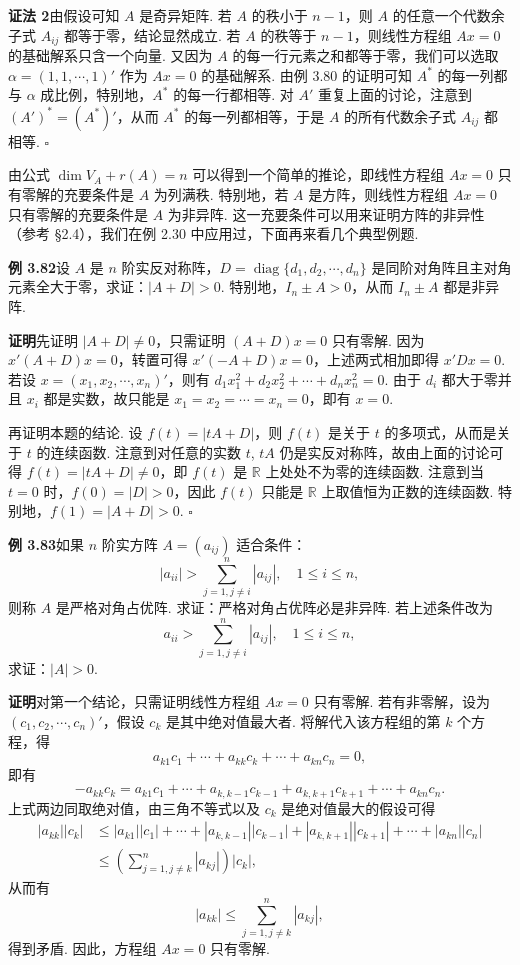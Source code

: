 \documentclass[UTF8, 12pt, fontset=fandol, oneside]{ctexart}
\begin{document}
\noindent\textbf{证法 2}\quad 由假设可知 $A$ 是奇异矩阵. 若 $A$ 的秩小于 $n-1$，则 $A$ 的任意一个代数余子式 $A_{ij}$ 都等于零，结论显然成立. 若 $A$ 的秩等于 $n-1$，则线性方程组 $Ax=0$ 的基础解系只含一个向量. 又因为 $A$ 的每一行元素之和都等于零，我们可以选取 $\alpha=(1,1,\cdots,1)'$ 作为 $Ax=0$ 的基础解系. 由例 3.80 的证明可知 $A^*$ 的每一列都与 $\alpha$ 成比例，特别地，$A^*$ 的每一行都相等. 对 $A'$ 重复上面的讨论，注意到 $(A')^*=(A^*)'$，从而 $A^*$ 的每一列都相等，于是 $A$ 的所有代数余子式 $A_{ij}$ 都相等. $\square$

由公式 $\dim V_A+r(A)=n$ 可以得到一个简单的推论，即线性方程组 $Ax=0$ 只有零解的充要条件是 $A$ 为列满秩. 特别地，若 $A$ 是方阵，则线性方程组 $Ax=0$ 只有零解的充要条件是 $A$ 为非异阵. 这一充要条件可以用来证明方阵的非异性（参考 §2.4），我们在例 2.30 中应用过，下面再来看几个典型例题.

\noindent\textbf{例 3.82}\quad 设 $A$ 是 $n$ 阶实反对称阵，$D=\operatorname{diag}\{d_1,d_2,\cdots,d_n\}$ 是同阶对角阵且主对角元素全大于零，求证：$|A+D|>0$. 特别地，$I_n\pm A>0$，从而 $I_n\pm A$ 都是非异阵.

\noindent\textbf{证明}\quad 先证明 $|A+D|\ne 0$，只需证明 $(A+D)x=0$ 只有零解. 因为 $x'(A+D)x=0$，转置可得 $x'(-A+D)x=0$，上述两式相加即得 $x'Dx=0$. 若设 $x=(x_1,x_2,\cdots,x_n)'$，则有 $d_1x_1^2+d_2x_2^2+\cdots+d_nx_n^2=0$. 由于 $d_i$ 都大于零并且 $x_i$ 都是实数，故只能是 $x_1=x_2=\cdots=x_n=0$，即有 $x=0$.

再证明本题的结论. 设 $f(t)=|tA+D|$，则 $f(t)$ 是关于 $t$ 的多项式，从而是关于 $t$ 的连续函数. 注意到对任意的实数 $t$, $tA$ 仍是实反对称阵，故由上面的讨论可得 $f(t)=|tA+D|\ne 0$，即 $f(t)$ 是 $\mathbb{R}$ 上处处不为零的连续函数. 注意到当 $t=0$ 时，$f(0)=|D|>0$，因此 $f(t)$ 只能是 $\mathbb{R}$ 上取值恒为正数的连续函数. 特别地，$f(1)=|A+D|>0$. $\square$

\noindent\textbf{例 3.83}\quad 如果 $n$ 阶实方阵 $A=(a_{ij})$ 适合条件：
\[
|a_{ii}|>\sum_{j=1,j\ne i}^n |a_{ij}|,\quad 1\le i\le n,
\]
则称 $A$ 是严格对角占优阵. 求证：严格对角占优阵必是非异阵. 若上述条件改为
\[
a_{ii}>\sum_{j=1,j\ne i}^n |a_{ij}|,\quad 1\le i\le n,
\]
求证：$|A|>0$.

\noindent\textbf{证明}\quad 对第一个结论，只需证明线性方程组 $Ax=0$ 只有零解. 若有非零解，设为 $(c_1,c_2,\cdots,c_n)'$，假设 $c_k$ 是其中绝对值最大者. 将解代入该方程组的第 $k$ 个方程，得
\[
a_{k1}c_1+\cdots+a_{kk}c_k+\cdots+a_{kn}c_n=0,
\]
即有
\[
-a_{kk}c_k=a_{k1}c_1+\cdots+a_{k,k-1}c_{k-1}+a_{k,k+1}c_{k+1}+\cdots+a_{kn}c_n.
\]
上式两边同取绝对值，由三角不等式以及 $c_k$ 是绝对值最大的假设可得
\[
\begin{aligned}
|a_{kk}||c_k|&\le |a_{k1}||c_1|+\cdots+|a_{k,k-1}||c_{k-1}|+|a_{k,k+1}||c_{k+1}|+\cdots+|a_{kn}||c_n|\\
&\le \left(\sum_{j=1,j\ne k}^n |a_{kj}|\right)|c_k|,
\end{aligned}
\]
从而有
\[
|a_{kk}|\le \sum_{j=1,j\ne k}^n |a_{kj}|,
\]
得到矛盾. 因此，方程组 $Ax=0$ 只有零解.
\end{document}
